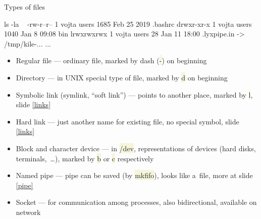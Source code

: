 \documentclass[compress, xelatex, 11pt, xcolor=svgnames, aspectratio=169, url={hyphens, lowtilde}]{beamer}
\renewcommand{\texttt}[1]{\colorbox{Beige}{{\ttfamily #1}}}
\begin{document}
\begin{frame}[fragile]{Types of files}
	\begin{bashcode}
    ls -la ~
    -rw-r--r-- 1 vojta users 1685 Feb 25  2019 .bashrc
    drwxr-xr-x 1 vojta users 1040 Jan  8 09:08 bin
    lrwxrwxrwx 1 vojta users   28 Jan 11 18:00 .lyxpipe.in -> /tmp/kile-...
    ...
	\end{bashcode}
	\vfill
	\begin{itemize}
		\item Regular file --- ordinary file, marked by dash (\texttt{-}) on beginning
		\item Directory --- in UNIX special type of file, marked by \texttt{d} on beginning
		\item Symbolic link (symlink, \enquote{soft link}) --- points to another place, marked by \texttt{l}, slide \ref{links}
		\item Hard link --- just another name for existing file, no special symbol, slide \ref{links}
		\item Block and character device --- in \texttt{/dev}, representations of devices (hard disks, terminals,~\ldots), marked by \texttt{b} or \texttt{c} respectively
		\item Named pipe --- pipe can be saved (by \texttt{mkfifo}), looks like a~file, more at slide \ref{pipe}
		\item Socket --- for communication among processes, also bidirectional, available on network
	\end{itemize}
\end{frame}
\end{document}
